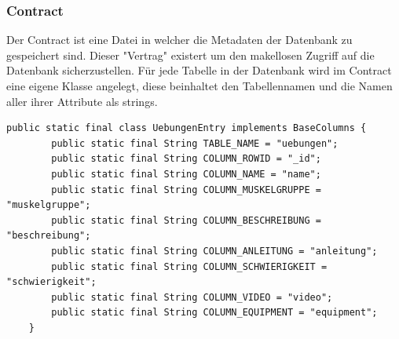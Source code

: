 \documentclass[FIPLY_base.tex]{subfiles}
\begin{document}
\subsubsection{Contract}
Der Contract ist eine Datei in welcher die Metadaten der Datenbank zu gespeichert sind.
Dieser "Vertrag" existert um den makellosen Zugriff auf die Datenbank sicherzustellen.
Für jede Tabelle in der Datenbank wird im Contract eine eigene Klasse angelegt, diese beinhaltet den Tabellennamen und die Namen aller ihrer Attribute als strings.
\begin{lstlisting}[caption={Eine Contract Klasse, mit allen Metadaten.},label=DescriptiveLabel]
    public static final class UebungenEntry implements BaseColumns {
        public static final String TABLE_NAME = "uebungen";
        public static final String COLUMN_ROWID = "_id";
        public static final String COLUMN_NAME = "name";
        public static final String COLUMN_MUSKELGRUPPE = "muskelgruppe";
        public static final String COLUMN_BESCHREIBUNG = "beschreibung";
        public static final String COLUMN_ANLEITUNG = "anleitung";
        public static final String COLUMN_SCHWIERIGKEIT = "schwierigkeit";
        public static final String COLUMN_VIDEO = "video";
        public static final String COLUMN_EQUIPMENT = "equipment";
    }
\end{lstlisting}
\end{document}
